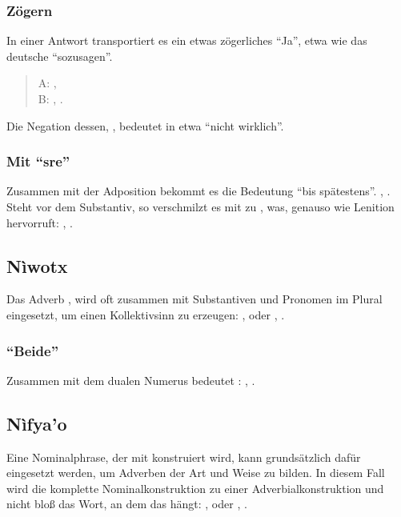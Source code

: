 \subsubsection{Z\"ogern} In einer Antwort transportiert es ein etwas z\"ogerliches "`Ja"',
etwa wie das deutsche "`sozusagen"'.

\begin{quotation}
\noindent A: , \\
\noindent B: , .
\end{quotation}

\noindent Die Negation dessen, , bedeutet in etwa "`nicht wirklich"'.

\subsubsection{Mit "`sre"'} Zusammen mit der Adposition  bekommt es die Bedeutung
"`bis sp\"atestens"'. , .
\label{syn:li:sre} Steht  vor dem Substantiv, so verschmilzt es mit  zu
, was, genauso wie  Lenition hervorruft: ,
.


\subsection{N\`iwotx} Das Adverb ,  wird oft
zusammen mit Substantiven und Pronomen im Plural eingesetzt, um einen Kollektivsinn zu
erzeugen: ,
 oder
,
.

\subsubsection{"`Beide"'} Zusammen mit dem dualen Numerus bedeutet  :
, .

\subsection{N\`ifya’o} Eine Nominalphrase, der mit  konstruiert wird, kann
grunds\"atzlich daf\"ur eingesetzt werden, um Adverben der Art und Weise zu bilden. In diesem
Fall wird die komplette Nominalkonstruktion zu einer Adverbialkonstruktion und nicht blo\ss{}
das Wort, an dem das  h\"angt: ,  oder , .
\label{syn:nifyao}

